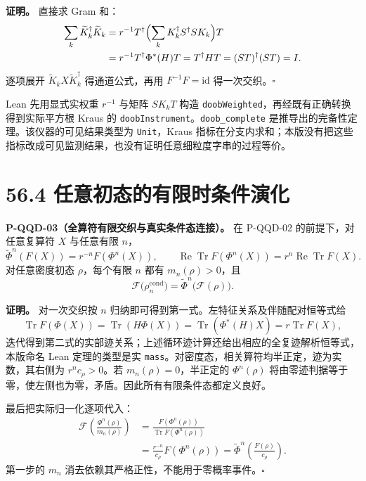 \documentclass[
  11pt,
  oneside]{book}
\begin{document}
\textbf{证明。} 直接求 Gram 和： \[
\begin{aligned}
\sum_k\widetilde K_k^\dagger\widetilde K_k
&=r^{-1}T^\dagger\Bigl(\sum_kK_k^\dagger S^\dagger SK_k\Bigr)T\\
&=r^{-1}T^\dagger\Phi^*(H)T
=T^\dagger HT=(ST)^\dagger(ST)=I.
\end{aligned}
\] 逐项展开 \(\widetilde K_kX\widetilde K_k^\dagger\) 得通道公式，再用
\(F^{-1}F=\mathrm{id}\) 得一次交织。\(\square\)

Lean 先用显式实权重 \(r^{-1}\) 与矩阵 \(SK_kT\) 构造
\texttt{doob\allowbreak Weighted}，再经既有正确转换得到实际平方根 Kraus 的
\texttt{doob\allowbreak Instrument}。\texttt{doob\_\allowbreak complete}
是推导出的完备性定理。该仪器的可见结果类型为 \texttt{Unit}，Kraus
指标在分支内求和；本版没有把这些指标改成可见监测结果，也没有证明任意细粒度字串的过程等价。

\section{56.4 任意初态的有限时条件演化}

\protect\hypertarget{p-qqd-03}{}{}

\textbf{P-QQD-03（全算符有限交织与真实条件态连接）。} 在 P-QQD-02
的前提下，对任意复算符 \(X\) 与任意有限 \(n\)， \[
\widetilde\Phi^n(F(X))=r^{-n}F(\Phi^n(X)),
\qquad \operatorname{Re}\operatorname{Tr}F(\Phi^n(X))=r^n\operatorname{Re}\operatorname{Tr}F(X).
\] 对任意密度初态 \(\rho\)，每个有限 \(n\) 都有 \(m_n(\rho)>0\)，且 \[
\mathcal F\bigl(\rho_n^{\mathrm{cond}}\bigr)
=\widetilde\Phi^n\bigl(\mathcal F(\rho)\bigr).
\]

\textbf{证明。} 对一次交织按 \(n\)
归纳即可得到第一式。左特征关系及伴随配对恒等式给 \[
\operatorname{Tr}F(\Phi(X))
=\operatorname{Tr}(H\Phi(X))
=\operatorname{Tr}(\Phi^*(H)X)
=r\operatorname{Tr}F(X),
\]
迭代得到第二式的实部迹关系；上述循环迹计算还给出相应的全复迹解析恒等式，本版命名
Lean 定理的类型是实
\texttt{mass}。对密度态，相关算符均半正定，迹为实数，其右侧为
\(r^nc_\rho>0\)。若 \(m_n(\rho)=0\)，半正定的 \(\Phi^n(\rho)\)
将由零迹判据等于零，使左侧也为零，矛盾。因此所有有限条件态都定义良好。

最后把实际归一化逐项代入： \[
\begin{aligned}
\mathcal F\!\left(\frac{\Phi^n(\rho)}{m_n(\rho)}\right)
&=\frac{F(\Phi^n(\rho))}{\operatorname{Tr}F(\Phi^n(\rho))}\\
&=\frac{r^{-n}}{c_\rho}F(\Phi^n(\rho))
=\widetilde\Phi^n\!\left(\frac{F(\rho)}{c_\rho}\right).
\end{aligned}
\] 第一步的 \(m_n\) 消去依赖其严格正性，不能用于零概率事件。\(\square\)
\end{document}
